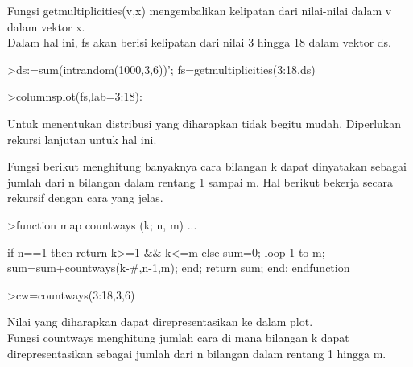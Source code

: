 \documentclass[a4paper,10pt]{article}
\begin{document}
\begin{eulernotebook}
\begin{eulercomment}
\begin{eulercomment}
\begin{eulercomment}
\begin{eulercomment}
\begin{eulercomment}
\begin{eulercomment}
\begin{eulercomment}
\begin{eulercomment}
\begin{eulercomment}
\begin{eulercomment}
\begin{eulercomment}
\begin{eulercomment}
\begin{eulercomment}
\begin{eulercomment}
\begin{eulercomment}
\begin{eulercomment}
\begin{eulercomment}
\begin{eulercomment}
\begin{eulercomment}
Fungsi getmultiplicities(v,x) mengembalikan kelipatan dari nilai-nilai
dalam v dalam vektor x.\\
Dalam hal ini, fs akan berisi kelipatan dari nilai 3 hingga 18 dalam
vektor ds.
\end{eulercomment}
\begin{eulerprompt}
>ds:=sum(intrandom(1000,3,6))';  fs=getmultiplicities(3:18,ds)
\end{eulerprompt}
\begin{euleroutput}
  [5,  15,  31,  42,  75,  98,  132,  114,  122,  106,  83,  74,  54,
  25,  16,  8]
\end{euleroutput}
\begin{eulerprompt}
>columnsplot(fs,lab=3:18):
\end{eulerprompt}
\begin{eulercomment}
Untuk menentukan distribusi yang diharapkan tidak begitu mudah.
Diperlukan rekursi lanjutan untuk hal ini.

Fungsi berikut menghitung banyaknya cara bilangan k dapat dinyatakan
sebagai jumlah dari n bilangan dalam rentang 1 sampai m. Hal berikut
bekerja secara rekursif dengan cara yang jelas.
\end{eulercomment}
\begin{eulerprompt}
>function map countways (k; n, m) ...
\end{eulerprompt}
\begin{eulerudf}
    if n==1 then return k>=1 && k<=m
    else
      sum=0; 
      loop 1 to m; sum=sum+countways(k-#,n-1,m); end;
      return sum;
    end;
  endfunction
\end{eulerudf}
\begin{eulerprompt}
>cw=countways(3:18,3,6)
\end{eulerprompt}
\begin{euleroutput}
  [1,  3,  6,  10,  15,  21,  25,  27,  27,  25,  21,  15,  10,  6,  3,
  1]
\end{euleroutput}
\begin{eulercomment}
Nilai yang diharapkan dapat direpresentasikan ke dalam plot.\\
Fungsi countways menghitung jumlah cara di mana bilangan k dapat
direpresentasikan sebagai jumlah dari n bilangan dalam rentang 1
hingga m.


\end{eulercomment}
\end{eulercomment}
\end{eulercomment}
\end{eulercomment}
\end{eulercomment}
\end{eulercomment}
\end{eulercomment}
\end{eulercomment}
\end{eulercomment}
\end{eulercomment}
\end{eulercomment}
\end{eulercomment}
\end{eulercomment}
\end{eulercomment}
\end{eulercomment}
\end{eulercomment}
\end{eulercomment}
\end{eulercomment}
\end{eulercomment}
\end{eulernotebook}
\end{document}
